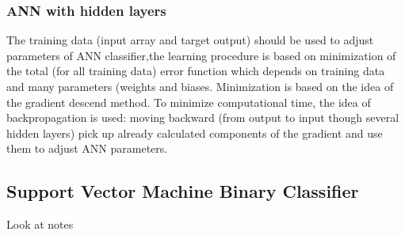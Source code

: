 \subsubsection{ANN with hidden layers}
 The training data (input array and target output) should be
used to adjust parameters of ANN classifier,the learning procedure is based on minimization of the
total (for all training data) error function which depends on
training data and many parameters (weights and biases. Minimization is based on the idea of the gradient descend method. To minimize computational time, the idea of
backpropagation is used: moving backward (from output to input though several hidden layers) pick up already calculated components of the gradient and use them to
adjust ANN parameters.
\subsection{Support Vector Machine Binary Classifier}
Look at notes